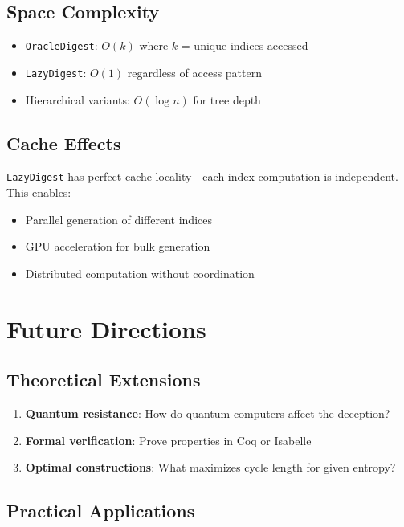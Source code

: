 \documentclass[11pt]{article}
\begin{document}
\subsection{Space Complexity}

\begin{itemize}
\item \texttt{OracleDigest}: $O(k)$ where $k$ = unique indices accessed
\item \texttt{LazyDigest}: $O(1)$ regardless of access pattern
\item Hierarchical variants: $O(\log n)$ for tree depth
\end{itemize}

\subsection{Cache Effects}

\texttt{LazyDigest} has perfect cache locality---each index computation is independent. This enables:
\begin{itemize}
\item Parallel generation of different indices
\item GPU acceleration for bulk generation
\item Distributed computation without coordination
\end{itemize}

\section{Future Directions}

\subsection{Theoretical Extensions}

\begin{enumerate}
\item \textbf{Quantum resistance}: How do quantum computers affect the deception?
\item \textbf{Formal verification}: Prove properties in Coq or Isabelle
\item \textbf{Optimal constructions}: What maximizes cycle length for given entropy?
\end{enumerate}

\subsection{Practical Applications}
\end{document}
